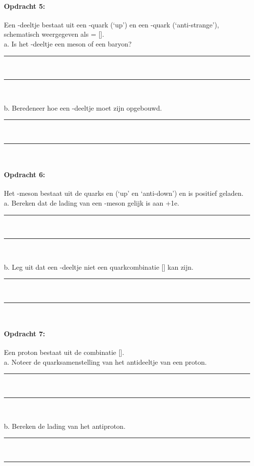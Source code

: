 \paragraph{Opdracht 5:}
Een \PKplus -deeltje bestaat uit een \Pup -quark (`up') en een \APqs-quark 
(`anti-strange'), schematisch weergegeven als \PKplus = [\Pup\APqs].\\
a. Is het \PKplus -deeltje een meson of een baryon?
\begin{center}
    \rule{\textwidth}{0.3mm}\\
    \rule{\textwidth}{0.3mm}\\
\end{center}
b. Beredeneer hoe een \PKm-deeltje moet zijn opgebouwd.
\begin{center}
    \rule{\textwidth}{0.3mm}\\
    \rule{\textwidth}{0.3mm}\\   
\end{center}

\paragraph{Opdracht 6:}
Het \Ppiplus-meson bestaat uit de quarks \Pup en \APdown  (`up' en `anti-down')
en is positief geladen.\\
a. Bereken dat de lading van een \Ppiplus-meson gelijk is aan +1e.
\begin{center}
    \rule{\textwidth}{0.3mm}\\
    \rule{\textwidth}{0.3mm}\\
\end{center}
b. Leg uit dat een \PSigmaplus-deeltje niet een quarkcombinatie [\Pstrange\Pdown\Pdown] 
kan zijn.
\begin{center}
    \rule{\textwidth}{0.3mm}\\
    \rule{\textwidth}{0.3mm}\\
\end{center}

\paragraph{Opdracht 7:}
Een proton bestaat uit de combinatie [\Pup\Pup\Pdown].\\
a. Noteer de quarksamenstelling van het antideeltje van een proton.
\begin{center}
    \rule{\textwidth}{0.3mm}\\
    \rule{\textwidth}{0.3mm}\\
\end{center}
b. Bereken de lading van het antiproton.
\begin{center}
    \rule{\textwidth}{0.3mm}\\
    \rule{\textwidth}{0.3mm}\\
\end{center}

